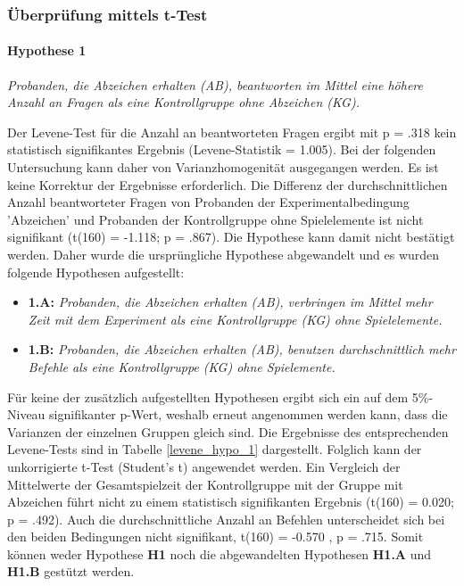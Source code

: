 \subsubsection{Überprüfung mittels t-Test}

\paragraph{Hypothese 1 }
\begin{center}
    \textit{Probanden, die Abzeichen erhalten (AB), beantworten im Mittel eine höhere Anzahl an Fragen als eine Kontrollgruppe ohne Abzeichen (KG).} 
\end{center}

Der Levene-Test für die Anzahl an beantworteten Fragen ergibt mit  p = .318 kein  statistisch  signifikantes  Ergebnis (Levene-Statistik = 1.005). Bei der folgenden Untersuchung kann daher von Varianzhomogenität ausgegangen werden. Es ist keine Korrektur der Ergebnisse erforderlich. Die Differenz der durchschnittlichen Anzahl beantworteter Fragen von Probanden der Experimentalbedingung 'Abzeichen' und Probanden der Kontrollgruppe ohne Spielelemente ist nicht signifikant (t(160) = -1.118; p = .867). Die Hypothese kann damit nicht bestätigt werden. Daher wurde die ursprüngliche Hypothese abgewandelt und es wurden folgende Hypothesen aufgestellt:

\begin{itemize}
    \item \textbf{1.A:} \textit{Probanden, die Abzeichen erhalten (AB), verbringen im Mittel mehr Zeit mit dem Experiment als eine Kontrollgruppe (KG) ohne Spielelemente.}
    \item \textbf{1.B:} \textit{Probanden, die Abzeichen erhalten (AB), benutzen durchschnittlich mehr Befehle als eine Kontrollgruppe (KG) ohne Spielemente.} 
\end{itemize}

Für keine der zusätzlich aufgestellten Hypothesen ergibt sich ein auf dem 5\%-Niveau signifikanter p-Wert, weshalb erneut angenommen werden kann, dass die Varianzen der einzelnen Gruppen gleich sind. Die Ergebnisse des entsprechenden Levene-Tests sind in Tabelle \ref{levene_hypo_1} dargestellt. Folglich kann der unkorrigierte t-Test (Student's t) angewendet werden. Ein Vergleich  der  Mittelwerte  der Gesamtspielzeit der Kontrollgruppe mit der Gruppe mit Abzeichen führt nicht zu einem statistisch signifikanten Ergebnis (t(160) = 0.020; p = .492). Auch die durchschnittliche Anzahl an Befehlen unterscheidet sich bei den beiden Bedingungen nicht signifikant, t(160) = -0.570 , p = .715. Somit können weder Hypothese \textbf{H1} noch die abgewandelten Hypothesen \textbf{H1.A} und \textbf{H1.B} gestützt werden.


